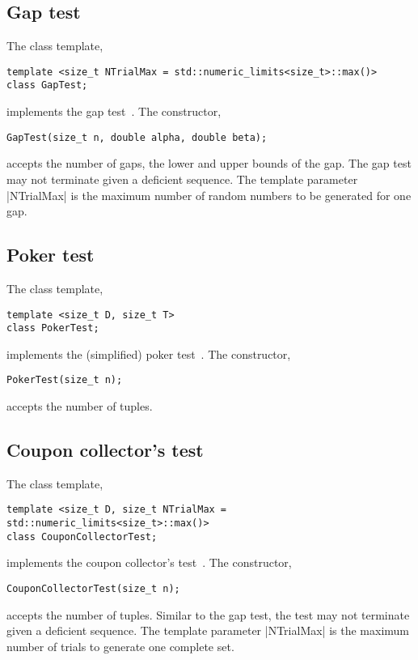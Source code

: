 \subsection{Gap test}
\label{sub:Gap test}

The class template,
\begin{verbatim}
template <size_t NTrialMax = std::numeric_limits<size_t>::max()>
class GapTest;
\end{verbatim}
implements the gap test~\cite[pp.~62]{Knuth:1997us}. The constructor,
\begin{verbatim}
GapTest(size_t n, double alpha, double beta);
\end{verbatim}
accepts the number of gaps, the lower and upper bounds of the gap. The gap test
may not terminate given a deficient sequence. The template parameter
|NTrialMax| is the maximum number of random numbers to be generated for one
gap.

\subsection{Poker test}
\label{sub:Poker test}

The class template,
\begin{verbatim}
template <size_t D, size_t T>
class PokerTest;
\end{verbatim}
implements the (simplified) poker test~\cite[pp.~63]{Knuth:1997us}. The
constructor,
\begin{verbatim}
PokerTest(size_t n);
\end{verbatim}
accepts the number of tuples.

\subsection{Coupon collector's test}
\label{sub:Coupon collector's test}

The class template,
\begin{verbatim}
template <size_t D, size_t NTrialMax = std::numeric_limits<size_t>::max()>
class CouponCollectorTest;
\end{verbatim}
implements the coupon collector's test~\cite[pp.~64]{Knuth:1997us}. The
constructor,
\begin{verbatim}
CouponCollectorTest(size_t n);
\end{verbatim}
accepts the number of tuples. Similar to the gap test, the test may not
terminate given a deficient sequence. The template parameter |NTrialMax| is the
maximum number of trials to generate one complete set.

